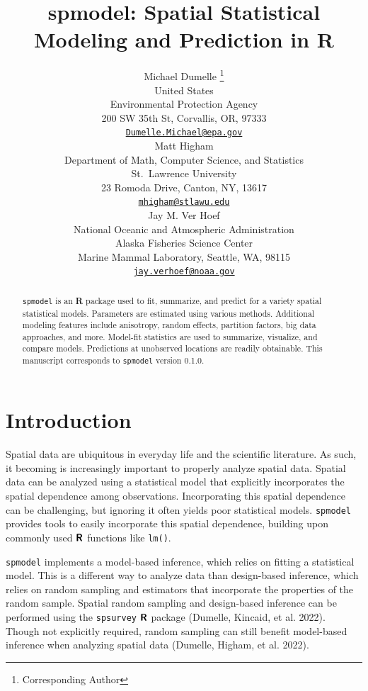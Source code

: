 \documentclass{article}
\title{spmodel: Spatial Statistical Modeling and Prediction in
\textbf{R}}
\author{
    Michael Dumelle
    \thanks{Corresponding Author}
   \\
    United States \\
    Environmental Protection Agency \\
  200 SW 35th St, Corvallis, OR, 97333 \\
  \texttt{\href{mailto:Dumelle.Michael@epa.gov}{\nolinkurl{Dumelle.Michael@epa.gov}}} \\
   \And
    Matt Higham
   \\
    Department of Math, Computer Science, and Statistics \\
    St.~Lawrence University \\
  23 Romoda Drive, Canton, NY, 13617 \\
  \texttt{\href{mailto:mhigham@stlawu.edu}{\nolinkurl{mhigham@stlawu.edu}}} \\
   \And
    Jay M. Ver Hoef
   \\
    National Oceanic and Atmospheric Administration \\
    Alaska Fisheries Science Center \\
  Marine Mammal Laboratory, Seattle, WA, 98115 \\
  \texttt{\href{mailto:jay.verhoef@noaa.gov}{\nolinkurl{jay.verhoef@noaa.gov}}} \\
  }
\begin{document}
\maketitle


\begin{abstract}
\texttt{spmodel} is an \textbf{\textsf{R}} package used to fit,
summarize, and predict for a variety spatial statistical models.
Parameters are estimated using various methods. Additional modeling
features include anisotropy, random effects, partition factors, big data
approaches, and more. Model-fit statistics are used to summarize,
visualize, and compare models. Predictions at unobserved locations are
readily obtainable. This manuscript corresponds to \texttt{spmodel}
version 0.1.0.
\end{abstract}


\hypertarget{sec:introduction}{%
\section{Introduction}\label{sec:introduction}}

Spatial data are ubiquitous in everyday life and the scientific
literature. As such, it becoming is increasingly important to properly
analyze spatial data. Spatial data can be analyzed using a statistical
model that explicitly incorporates the spatial dependence among
observations. Incorporating this spatial dependence can be challenging,
but ignoring it often yields poor statistical models. \texttt{spmodel}
provides tools to easily incorporate this spatial dependence, building
upon commonly used \(\textbf{\textsf{R}}\) functions like \texttt{lm()}.

\texttt{spmodel} implements a model-based inference, which relies on
fitting a statistical model. This is a different way to analyze data
than design-based inference, which relies on random sampling and
estimators that incorporate the properties of the random sample. Spatial
random sampling and design-based inference can be performed using the
\texttt{spsurvey} \(\textbf{\textsf{R}}\) package (Dumelle, Kincaid, et
al. 2022). Though not explicitly required, random sampling can still
benefit model-based inference when analyzing spatial data (Dumelle,
Higham, et al. 2022).
\end{document}
